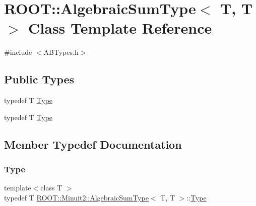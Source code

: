 \hypertarget{classROOT_1_1Minuit2_1_1AlgebraicSumType_3_01T_00_01T_01_4}{}\section{R\+O\+OT\+:\+:Algebraic\+Sum\+Type$<$ T, T $>$ Class Template Reference}
\label{classROOT_1_1Minuit2_1_1AlgebraicSumType_3_01T_00_01T_01_4}


{\ttfamily \#include $<$A\+B\+Types.\+h$>$}

\subsection*{Public Types}
\begin{DoxyCompactItemize}
\item 
typedef T \mbox{\hyperlink{classROOT_1_1Minuit2_1_1AlgebraicSumType_3_01T_00_01T_01_4_a840029212ccc1ff6fce3aeb7ec3187de}{Type}}
\item 
typedef T \mbox{\hyperlink{classROOT_1_1Minuit2_1_1AlgebraicSumType_3_01T_00_01T_01_4_a840029212ccc1ff6fce3aeb7ec3187de}{Type}}
\end{DoxyCompactItemize}


\subsection{Member Typedef Documentation}
\mbox{\label{classROOT_1_1Minuit2_1_1AlgebraicSumType_3_01T_00_01T_01_4_a840029212ccc1ff6fce3aeb7ec3187de}} 
\subsubsection{\texorpdfstring{Type}{Type}\hspace{0.1cm}{\footnotesize\ttfamily [1/2]}}
{\footnotesize\ttfamily template$<$class T $>$ \\
typedef T \mbox{\hyperlink{classROOT_1_1Minuit2_1_1AlgebraicSumType}{R\+O\+O\+T\+::\+Minuit2\+::\+Algebraic\+Sum\+Type}}$<$ T, T $>$\+::\mbox{\hyperlink{classROOT_1_1Minuit2_1_1AlgebraicSumType_3_01T_00_01T_01_4_a840029212ccc1ff6fce3aeb7ec3187de}{Type}}}

